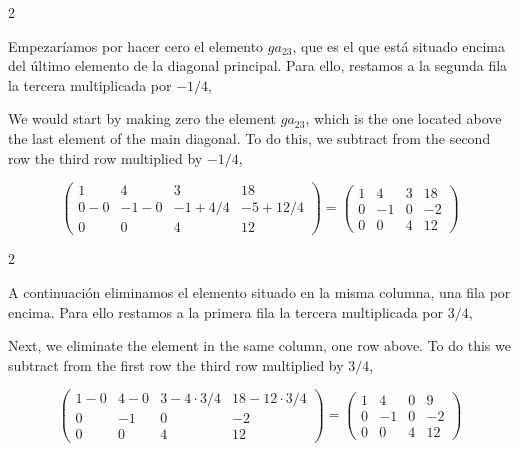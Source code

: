 \begin{paracol}{2}
\switchcolumn

Empezaríamos por hacer cero el elemento $ga_{23}$, que es el que está situado encima del último elemento de la diagonal principal. Para ello, restamos a la segunda fila la tercera multiplicada por $-1/4$,

\switchcolumn

We would start by making zero the element $ga_{23}$, which is the one located above the last element of the main diagonal. To do this, we subtract from the second row the third row multiplied by $-1/4$,

\end{paracol}

\begin{equation*}
\begin{pmatrix}
1&     4&     3&    18\\
 0-0&    -1-0&    -1+4/4&    -5+12/4\\
 0&     0&     4&    12
\end{pmatrix}=\begin{pmatrix}
1&     4&     3&    18\\
 0&    -1&    0&    -2\\
 0&     0&     4&    12
\end{pmatrix}
\end{equation*}

\begin{paracol}{2}

A continuación eliminamos el elemento situado en la misma columna, una fila por encima. Para ello restamos a la primera fila la tercera multiplicada por $3/4$,

\switchcolumn

Next, we eliminate the element in the same column, one row above. To do this we subtract from the first row the third row multiplied by $3/4$,

\end{paracol}

\begin{equation*}
\begin{pmatrix}
1-0&     4-0&     3-4\cdot 3/4&    18-12\cdot 3/4\\
 0&    -1&    0&    -2\\
 0&     0&     4&    12
\end{pmatrix}=\begin{pmatrix}
1&     4&     0&    9\\
 0&    -1&    0&    -2\\
 0&     0&     4&    12
\end{pmatrix}
\end{equation*}

